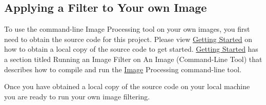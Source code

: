 \subsection*{Applying a Filter to Your own Image}

To use the command-\/line Image Processing tool on your own images, you first need to obtain the source code for this project. Please view \hyperlink{getting-started}{Getting Started} on how to obtain a local copy of the source code to get started. \hyperlink{getting-started}{Getting Started} has a section titled \textquotesingle{}Running an Image Filter on An Image (Command-\/\+Line Tool)\textquotesingle{} that describes how to compile and run the \hyperlink{classImage}{Image} Processing command-\/line tool.

Once you have obtained a local copy of the source code on your local machine you are ready to run your own image filtering.
